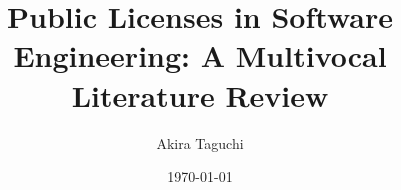 \documentclass[english,twoside,censored,csm,software-track-2020]{HYthesisML}
\title{Public Licenses in Software Engineering: A Multivocal Literature Review}
\author{Akira Taguchi}
\date{\today}
\begin{document}
\maketitle




\mytableofcontents

\mainmatter








{}  %
\printbibliography

\backmatter
\begin{appendices}



\end{appendices}
\end{document}
